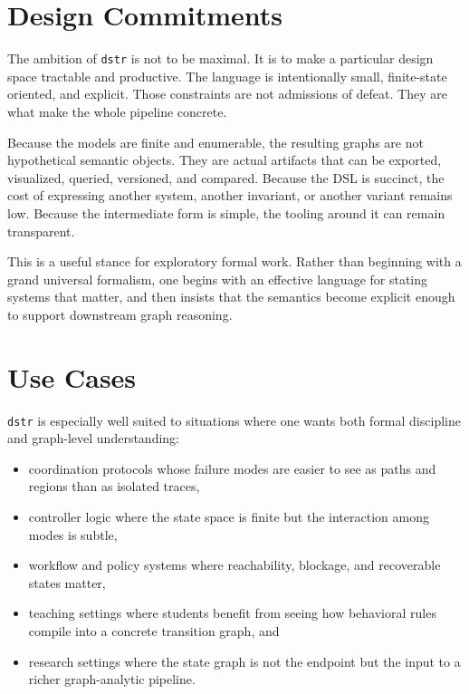 \documentclass[11pt]{article}
\begin{document}
\section{Design Commitments}

The ambition of \texttt{dstr} is not to be maximal. It is to make a particular
design space tractable and productive. The language is intentionally small,
finite-state oriented, and explicit. Those constraints are not admissions of
defeat. They are what make the whole pipeline concrete.

Because the models are finite and enumerable, the resulting graphs are not
hypothetical semantic objects. They are actual artifacts that can be exported,
visualized, queried, versioned, and compared. Because the DSL is succinct, the
cost of expressing another system, another invariant, or another variant remains
low. Because the intermediate form is simple, the tooling around it can remain
transparent.

This is a useful stance for exploratory formal work. Rather than beginning with
a grand universal formalism, one begins with an effective language for stating
systems that matter, and then insists that the semantics become explicit enough
to support downstream graph reasoning.

\section{Use Cases}

\texttt{dstr} is especially well suited to situations where one wants both
formal discipline and graph-level understanding:

\begin{itemize}[leftmargin=*]
\item coordination protocols whose failure modes are easier to see as paths and
regions than as isolated traces,
\item controller logic where the state space is finite but the interaction among
modes is subtle,
\item workflow and policy systems where reachability, blockage, and recoverable
states matter,
\item teaching settings where students benefit from seeing how behavioral rules
compile into a concrete transition graph, and
\item research settings where the state graph is not the endpoint but the input
to a richer graph-analytic pipeline.
\end{itemize}
\end{document}
